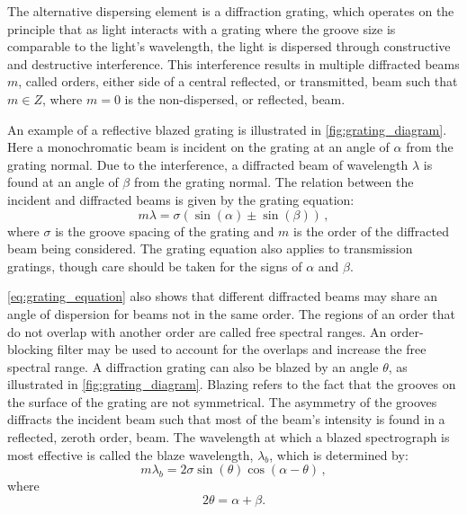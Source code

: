 The alternative dispersing element is a diffraction grating, which operates on the principle that as light interacts with a grating where the groove size is comparable to the light's wavelength, the light is dispersed through constructive and destructive interference. This interference results in multiple diffracted beams $m$, called orders, either side of a central reflected, or transmitted, beam such that $m \in Z$, where $m = 0$ is the non-dispersed, or reflected, beam.

An example of a reflective blazed grating is illustrated in \autoref{fig:grating_diagram}. Here a monochromatic beam is incident on the grating at an angle of $\alpha$ from the grating normal. Due to the interference, a diffracted beam of wavelength $\lambda$ is found at an angle of $\beta$ from the grating normal. The relation between the incident and diffracted beams is given by the grating equation:
\begin{equation}
    m\lambda = \sigma (\sin(\alpha) \pm \sin(\beta))\,,\label{eq:grating_equation}
\end{equation}
where $\sigma$ is the groove spacing of the grating and $m$ is the order of the diffracted beam being considered. The grating equation also applies to transmission gratings, though care should be taken for the signs of $\alpha$ and $\beta$.


\autoref{eq:grating_equation} also shows that different diffracted beams may share an angle of dispersion for beams not in the same order. The regions of an order that do not overlap with another order are called free spectral ranges. An order-blocking filter may be used to account for the overlaps and increase the free spectral range. A diffraction grating can also be blazed by an angle $\theta$, as illustrated in \autoref{fig:grating_diagram}. Blazing refers to the fact that the grooves on the surface of the grating are not symmetrical. The asymmetry of the grooves diffracts the incident beam such that most of the beam's intensity is found in a reflected, zeroth order, beam. The wavelength at which a blazed spectrograph is most effective is called the blaze wavelength, $\lambda_{b}$, which is determined by:
\begin{equation}
    m\lambda_{b} = 2\sigma\sin(\theta)\cos(\alpha - \theta)\,,\label{eq:blaze_wavelength}
\end{equation}
where
\begin{equation}
    2\theta = \alpha + \beta.
\end{equation}

